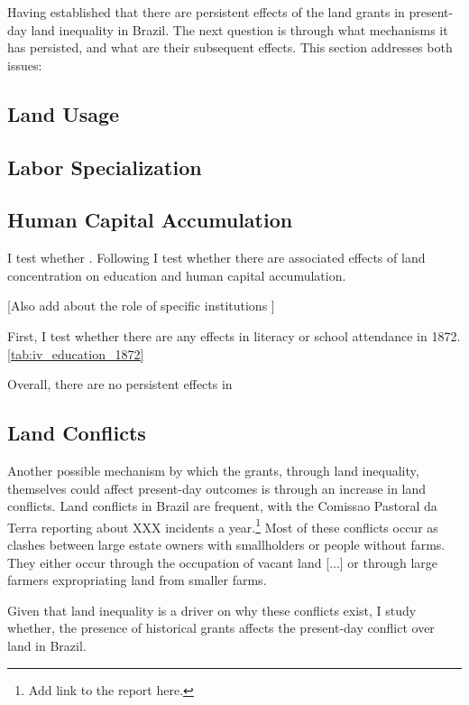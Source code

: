 \documentclass{article}
\begin{document}
Having established that there are persistent effects of the land grants in present-day land inequality in Brazil. The next question is through what mechanisms it has persisted, and what are their subsequent effects. This section addresses both issues:

\subsection{Land Usage}

\subsection{Labor Specialization}

\subsection{Human Capital Accumulation}

I test whether \parencite{Galor2006-ws}.
Following \textcite{Galor2009-bc} I test whether there are associated effects of land concentration on education and human capital accumulation.

[Also add about the role of specific institutions \parencite{Acemoglu2005-ti}]

First, I test whether there are any effects in literacy or school attendance in 1872. \autoref{tab:iv_education_1872}

Overall, there are no persistent effects in

\subsection{Land Conflicts}

Another possible mechanism by which the grants, through land inequality, themselves could affect present-day outcomes is through an increase in land conflicts. 
Land conflicts in Brazil are frequent, with the Comissao Pastoral da Terra reporting about XXX incidents a year.\footnote{Add link to the report here.}
Most of these conflicts occur as clashes between large estate owners with smallholders or people without farms.
They either occur through the occupation of vacant land [...] or through large farmers expropriating land from smaller farms. 

Given that land inequality is a driver on why these conflicts exist, I study whether, the presence of historical grants affects the present-day conflict over land in Brazil. 
\end{document}
